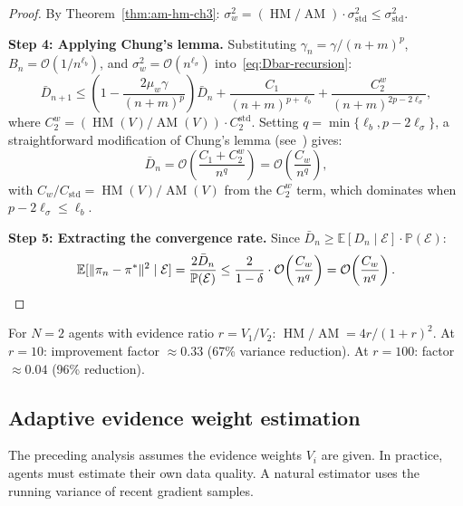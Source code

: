 \begin{proof}
By Theorem~\ref{thm:am-hm-ch3}: $\sigma_w^2 = (\operatorname{HM}/\operatorname{AM}) \cdot \sigma_{\mathrm{std}}^2 \leq \sigma_{\mathrm{std}}^2$.

\textbf{Step 4: Applying Chung's lemma.}
Substituting $\gamma_n = \gamma/(n+m)^p$, $B_n = \mathcal{O}(1/n^{\ell_b})$, and $\sigma_w^2 = \mathcal{O}(n^{\ell_\sigma})$ into~\eqref{eq:Dbar-recursion}:
\begin{equation}
    \bar{D}_{n+1} \leq \left(1 - \frac{2\mu_w \gamma}{(n+m)^p}\right) \bar{D}_n + \frac{C_1}{(n+m)^{p+\ell_b}} + \frac{C_2^w}{(n+m)^{2p - 2\ell_\sigma}}, \label{eq:chung-input}
\end{equation}
where $C_2^w = (\operatorname{HM}(V)/\operatorname{AM}(V)) \cdot C_2^{\mathrm{std}}$. Setting $q = \min\{\ell_b, p - 2\ell_\sigma\}$, a straightforward modification of Chung's lemma (see~\cite[Appendix~B]{giannou2022}) gives:
\begin{equation}
    \bar{D}_n = \mathcal{O}\!\left(\frac{C_1 + C_2^w}{n^q}\right) = \mathcal{O}\!\left(\frac{C_w}{n^q}\right),
\end{equation}
with $C_w / C_{\mathrm{std}} = \operatorname{HM}(V)/\operatorname{AM}(V)$ from the $C_2^w$ term, which dominates when $p - 2\ell_\sigma \leq \ell_b$.

\textbf{Step 5: Extracting the convergence rate.}
Since $\bar{D}_n \geq \mathbb{E}[D_n \mid \mathcal{E}] \cdot \mathbb{P}(\mathcal{E})$:
\begin{equation}
    \mathbb{E}[\|\pi_n - \pi^*\|^2 \mid \mathcal{E}] = \frac{2\bar{D}_n}{\mathbb{P}(\mathcal{E})} \leq \frac{2}{1 - \delta} \cdot \mathcal{O}\!\left(\frac{C_w}{n^q}\right) = \mathcal{O}\!\left(\frac{C_w}{n^q}\right). \qedhere
\end{equation}
\end{proof}


\begin{remark}
For $N = 2$ agents with evidence ratio $r = V_1/V_2$: $\operatorname{HM}/\operatorname{AM} = 4r/(1+r)^2$. At $r = 10$: improvement factor $\approx 0.33$ (67\% variance reduction). At $r = 100$: factor $\approx 0.04$ (96\% reduction).
\end{remark}


\subsection{Adaptive evidence weight estimation}

The preceding analysis assumes the evidence weights $V_i$ are given. In practice, agents must estimate their own data quality. A natural estimator uses the running variance of recent gradient samples.

